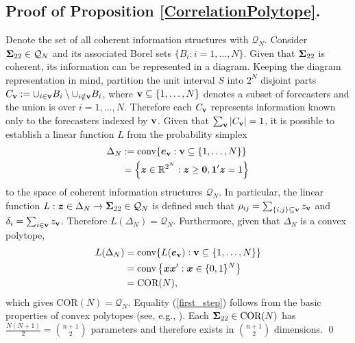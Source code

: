 \documentclass[12pt]{article}
\theoremstyle{definition}
\theoremstyle{definition}
\def\one{\mathbbm{1}}
\def\v{{\bf v}}
\def\conv{\text{conv}}
\begin{document}
\subsection{Proof of Proposition \ref{CorrelationPolytope}.}
Denote the set of all coherent information structures with $\mathcal{Q}_N$. Consider ${\bf\Sigma}_{22} \in \mathcal{Q}_N$ and its associated Borel sets $\{ B_i : i = 1, \dots, N\}$.  Given that ${\bf\Sigma}_{22}$ is coherent, its information can be represented in a diagram. Keeping the diagram representation in mind, partition the unit interval $S$ into $2^N$ disjoint parts $C_\v := \cup_{i \in \v} B_i \setminus \cup_{i \notin \v} B_i$, where $\v \subseteq \{1, \dots, N\}$ denotes a subset of forecasters and the union is over $i = 1, \dots, N$. Therefore each $C_\v$ represents information known only to the forecasters indexed by $\v$. Given that $\sum_{\v} |C_\v|  = 1$, it is possible to establish a linear function $L$ from the probability simplex
\begin{align*}
\Delta_N &:= \conv\{  \boldsymbol{e}_\v : \v \subseteq \{1, \dots, N\} \}\\
&= \left\{ \boldsymbol{z} \in \mathbb{R}^{2^N} : \boldsymbol{z} \geq \boldsymbol{0}, \boldsymbol{1}'\boldsymbol{z} = 1 \right\}
\end{align*}
to the space of coherent information structures $\mathcal{Q}_N$. In particular, the linear function $L: \boldsymbol{z} \in \Delta_N \to {\bf\Sigma}_{22} \in \mathcal{Q}_N$ is defined such that $\rho_{ij} = \sum_{\{i,j\} \subseteq \v} z_\v$ and $\delta_i =  \sum_{i \in \v} z_\v$. Therefore $L(\Delta_N) = \mathcal{Q}_N$. Furthermore, given that $\Delta_N$ is a convex polytope, 
\begin{align}
L(\Delta_N) &= \conv\{  L(\boldsymbol{e}_\v) : \v \subseteq \{1, \dots, N\} \} \label{first_step}\\
&=  \conv \left\{\boldsymbol{x}\boldsymbol{x}' : \boldsymbol{x}  \in \{0,1\}^N \right\} \nonumber\\
&= \text{COR}(N), \nonumber
\end{align}
which gives $\text{COR}(N) = \mathcal{Q}_N$. Equality (\ref{first_step}) follows from the basic properties of convex polytopes (see, e.g., \citealt{mcmullen1971convex}).  Each ${\bf\Sigma}_{22} \in \text{COR}(N)$ has $\frac{N(N+1)}{2} = \binom{n+1}{2}$ parameters and therefore exists in $\binom{n+1}{2}$ dimensions. \qed
\end{document}
